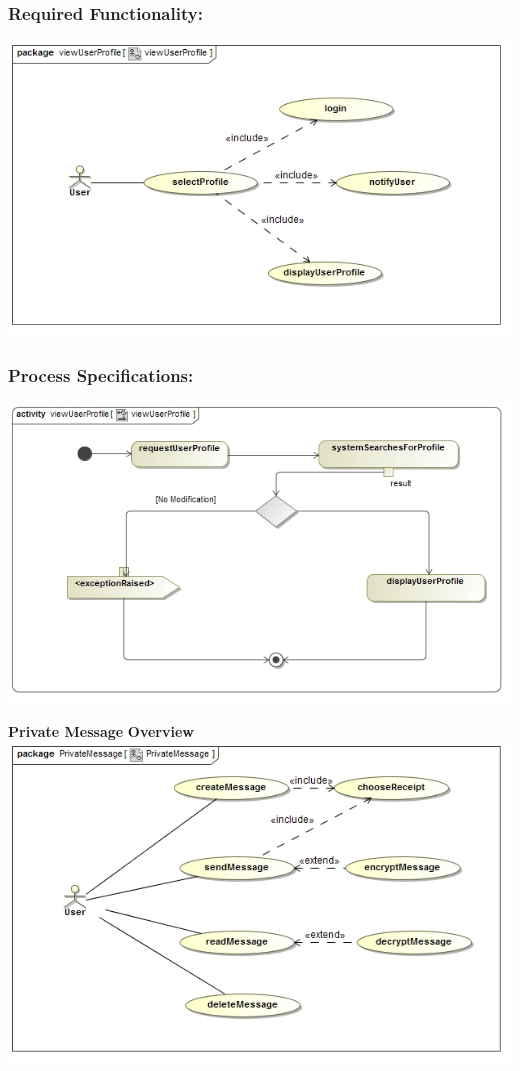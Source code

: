 \documentclass[a4paper,11pt]{article}
\begin{document}
\subsubsection{Required Functionality:} 
\includegraphics[width=1\linewidth]{./Images/UserProfile/ViewUserProfileUseCase}
\subsubsection{Process Specifications:} 
\includegraphics[width=1\linewidth]{./Images/UserProfile/ViewUserProfileActivity}

\textbf{Private Message}
\textbf{Overview}\\
\includegraphics[width=1\linewidth]{./Images/OverviewDiagrams/PrivateMessage.jpg}\\
\end{document}
